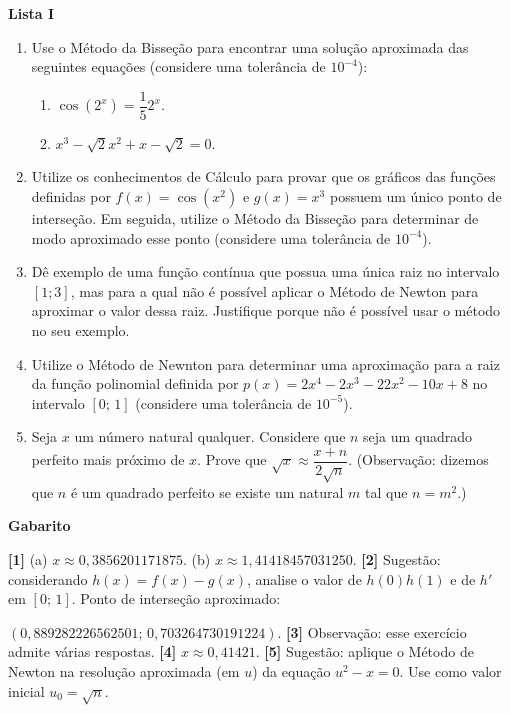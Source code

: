 \documentclass[12pt,a4paper]{article}
\begin{document}
\begin{center}
  \textbf{Lista I}
\end{center}

\begin{enumerate}
\item Use o Método da Bisseção para encontrar uma solução aproximada das seguintes
equações (considere uma tolerância de $10^{-4}$):
 \begin{enumerate}
  \item $\cos\left(2^x\right) = \dfrac{1}{5}2^x$.
  \item $x^3 - \sqrt{2}x^2 + x - \sqrt{2} = 0$.
 \end{enumerate}

 \item Utilize os conhecimentos de Cálculo para provar que os gráficos das funções definidas por 
$f(x) = \cos\left(x^2\right)$ e $g(x) = x^3$ possuem um único ponto de interseção. Em seguida, utilize 
o Método da Bisseção para determinar de modo aproximado esse ponto (considere uma tolerância de $10^{-4}$).

  \item Dê exemplo de uma função contínua que possua uma única raiz no intervalo $[1; 3]$,
  mas para a qual não é possível aplicar o Método de Newton para aproximar o valor dessa
  raiz. Justifique porque não é possível usar o método no seu exemplo.
  
  \item Utilize o Método de Newnton para determinar uma aproximação para a raiz da
  função polinomial definida por $p(x) = 2x^4 -2x^3 -22x^2 - 10x + 8$ no intervalo
  $[0;\,1]$ (considere uma tolerância de $10^{-5}$).
  
  \item Seja $x$ um número natural qualquer. Considere que $n$ seja um quadrado
  perfeito mais próximo de $x$. Prove que $\sqrt{x}\approx \dfrac{x+n}{2\sqrt{n}}$. 
 (Observação: dizemos que $n$ é um quadrado perfeito se existe um natural $m$ tal
 que $n = m^2$.) 

\end{enumerate}

\begin{center}
\textbf{Gabarito}
\end{center}
\textbf{[1]} (a) $x\approx 0,3856201171875$. (b) $x\approx 1,41418457031250$. 
\textbf{[2]} Sugestão: considerando $h(x) = f(x) - g(x)$, analise o valor de 
$h(0)h(1)$ e de $h'$ em $[0;\,1]$. Ponto de interseção aproximado: 

$(0,889282226562501;\,0,703264730191224)$.
\textbf{[3]} Observação: esse exercício admite várias respostas.
\textbf{[4]} $x\approx 0,41421$. 
\textbf{[5]} Sugestão: aplique o Método de Newton na resolução aproximada (em $u$) da 
equação $u^2 - x = 0$. Use como valor inicial $u_0 = \sqrt{n}$.
\end{document}
